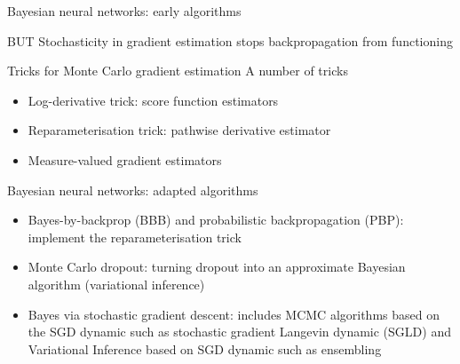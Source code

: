 \documentclass[9pt]{beamer}
\begin{document}
\begin{frame}{Bayesian neural networks: early algorithms}
\begin{alertblock}{BUT}
	Stochasticity in gradient estimation stops backpropagation from functioning
\end{alertblock}
\pause


\begin{block}{Tricks for Monte Carlo gradient estimation}
	A number of \alert{tricks} \citep[see][]{mohamed2020montecarlo}
	\begin{itemize}
		\item Log-derivative trick: score function estimators
		\item Reparameterisation trick: pathwise derivative estimator
		\item Measure-valued gradient estimators
	\end{itemize}
\end{block}
\end{frame}



\begin{frame}{Bayesian neural networks: adapted algorithms}
\begin{itemize}
	\item \alert{Bayes-by-backprop} (BBB) and \alert{probabilistic backpropagation} (PBP): implement the reparameterisation trick
	\item \alert{Monte Carlo dropout}: turning dropout into an approximate Bayesian algorithm (variational inference)
	\item  \alert{Bayes via stochastic gradient descent}: includes MCMC algorithms based on the SGD dynamic such as stochastic gradient Langevin dynamic (SGLD) and Variational Inference based on SGD dynamic such as ensembling
\end{itemize}
\end{frame}
\end{document}
